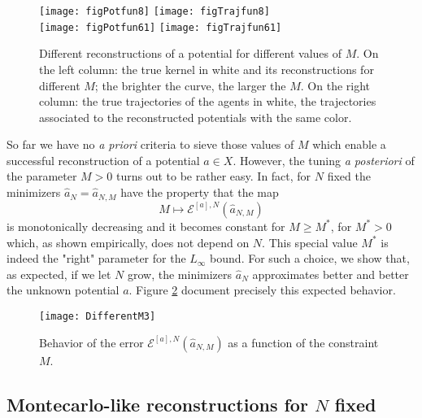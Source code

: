 \begin{figure}[h!]
\begin{center}
\hspace{-0.7cm}\texttt{[image: figPotfun8]}\hspace{-0.9cm}
\texttt{[image: figTrajfun8]}\\
\hspace{-0.7cm}\texttt{[image: figPotfun61]}\hspace{-0.9cm}
\texttt{[image: figTrajfun61]}
\end{center}
\caption{Different reconstructions of a potential for different values of $M$. On the left column: the true kernel in white and its reconstructions for different $M$; the brighter the curve, the larger the $M$. On the right column: the true trajectories of the agents in white, the trajectories associated to the reconstructed potentials with the same color.}\label{Mconstr1}
\end{figure}

So far we have no  {\it a priori} criteria to sieve those values of $M$ which enable a successful reconstruction of a potential $a \in X$. However,  the tuning {\it a posteriori} of the parameter $M>0$ turns out to be rather easy. In fact, for $N$ fixed the minimizers $\widehat a_N = \widehat a_{N,M}$ have the property that the map
$$
 M \mapsto   \mathcal E^{[a],N}(\widehat a_{N,M})
$$
is monotonically decreasing and it becomes constant for $M\geq M^*$, for $M^*>0$ which, as shown empirically, does not depend on $N$. This special value $M^*$ is indeed the "right" parameter for the $L_\infty$ bound. For such a choice, we show that, as expected, if we let $N$ grow, the minimizers $\widehat{a}_N$ approximates better and better the unknown potential $a$. 
Figure \ref{Mconstr} document precisely this expected behavior.

\begin{figure}[h!]
\begin{center}
\texttt{[image: DifferentM3]}
\end{center}
\caption{Behavior of the error $\mathcal E^{[a],N}(\widehat a_{N,M})$ as a function of the constraint $M$.}\label{Mconstr}
\end{figure}

\subsection{Montecarlo-like reconstructions for $N$ fixed}

